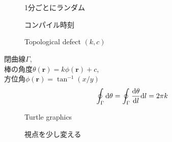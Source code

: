 \documentclass[./main]{subfiles}
\begin{document}
\begin{frame}
  \frametitle{\secname\ \subsecname}

  \centering

  \begin{figure}[htbp]
    \centering
    \begin{minipage}{0.45\linewidth}
      \centering
      \reinitrand[counter=random,first=0,last=23]  \rand
      \reinitrand[counter=random2,first=0,last=59] \rand
      \caption{1分ごとにランダム}
    \end{minipage}
    \begin{minipage}{0.45\linewidth}
      \centering
      \caption{コンパイル時刻}
    \end{minipage}
  \end{figure}

  \framebreak

  \begin{minipage}{0.45\linewidth}
    \begin{figure}[htbp]
      \centering
      
      \caption{\centering Topological defect $(k,c)$\\\citep{topo,tikz-topo}}
    \end{figure}
  \end{minipage}
  \hfill
  \begin{minipage}{0.5\linewidth}
    閉曲線$\Gamma$,\\
    棒の角度$\theta(\bm{r})=k\phi(\bm{r})+c$,\\
    方位角$\phi(\bm{r})=\tan^{-1}(x/y)$
    \begin{equation*}
      \oint_\Gamma\mathrm{d}\theta=\oint_\Gamma\frac{\mathrm{d}\theta}{\mathrm{d} l}\mathrm{d} l=2\pi k
    \end{equation*}
  \end{minipage}  

  \framebreak
  \begin{figure}[htbp]
    \centering
    
    \caption{Turtle graphics}
  \end{figure}

  \framebreak
  \begin{figure}[htbp]
    \centering
    
    \caption{視点を少し変える\citep{tikz-3dplot}}
  \end{figure}


\end{frame}
\end{document}
